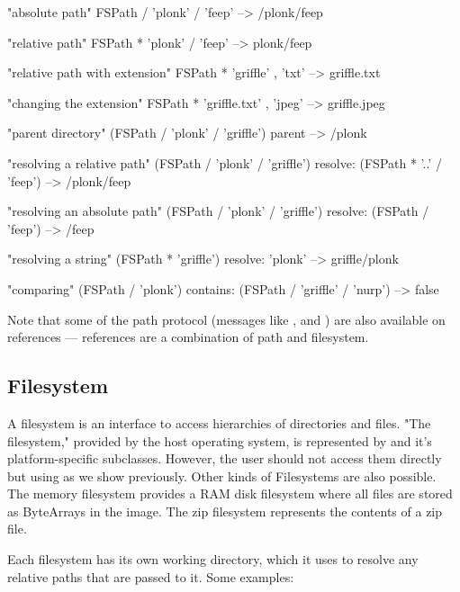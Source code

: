 \documentclass[a4paper,10pt,twoside]{book}
\begin{document}
\begin{code}{}
"absolute path"
FSPath / 'plonk' / 'feep'       --> /plonk/feep
    
"relative path"
FSPath * 'plonk' / 'feep'       --> plonk/feep

"relative path with extension"
FSPath * 'griffle' , 'txt'      --> griffle.txt
    
"changing the extension"
FSPath * 'griffle.txt' , 'jpeg'     --> griffle.jpeg
    
"parent directory"
(FSPath / 'plonk' / 'griffle') parent   --> /plonk
    
"resolving a relative path"
(FSPath / 'plonk' / 'griffle') resolve: (FSPath * '..' / 'feep')
                   --> /plonk/feep
    
"resolving an absolute path"
(FSPath / 'plonk' / 'griffle') resolve: (FSPath / 'feep')
                   --> /feep
                                           
"resolving a string"
(FSPath * 'griffle') resolve: 'plonk'   --> griffle/plonk
                        
"comparing"
(FSPath / 'plonk') contains: (FSPath / 'griffle' / 'nurp')
                     --> false
\end{code}

Note that some of the path protocol (messages like \ct{/},  and ) are also available on references --- references are a combination of path and filesystem. 


\subsection{Filesystem}

A filesystem is an interface to access hierarchies of directories and files. "The filesystem," provided by the host operating system, is represented by  and it's platform-specific subclasses. However, the user should not access them directly but using  as we show previously. Other kinds of Filesystems are also possible. The memory filesystem provides a RAM disk filesystem where all files are stored as ByteArrays in the image. The zip filesystem represents the contents of a zip file.

Each filesystem has its own working directory, which it uses to resolve any relative paths that are passed to it. Some examples:
\end{document}
